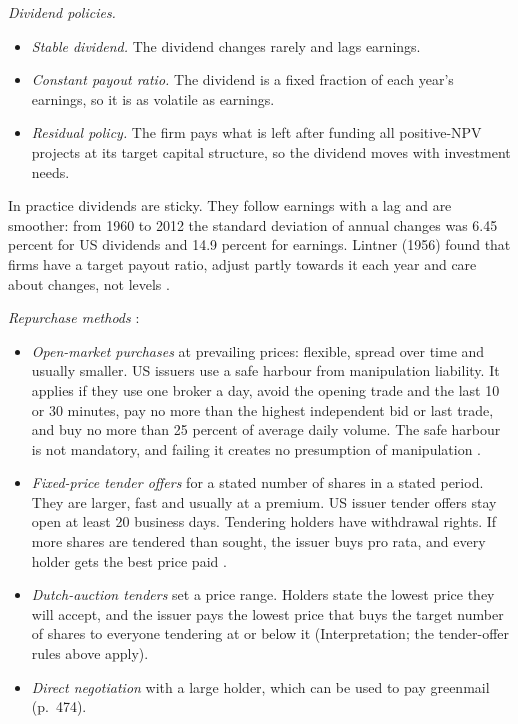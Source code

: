 \begin{qfmethod}\label{meth:payout-policy-comparison}
 \emph{Dividend policies.}
\begin{itemize}
\item \emph{Stable dividend.} The dividend changes rarely and lags earnings.
\item \emph{Constant payout ratio.} The dividend is a fixed fraction of each year's earnings, so it is as volatile as earnings.
\item \emph{Residual policy.} The firm pays what is left after funding all positive-NPV projects at its target capital structure, so the dividend moves with investment needs.
\end{itemize}
In practice dividends are sticky. They follow earnings with a lag and are smoother: from 1960 to 2012 the standard deviation of annual changes was 6.45 percent for US dividends and 14.9 percent for earnings. Lintner (1956) found that firms have a target payout ratio, adjust partly towards it each year and care about changes, not levels \citep[pp.~442--444]{applied-corporate-finance-2014}.

\emph{Repurchase methods} \citep[p.~474]{applied-corporate-finance-2014}:
\begin{itemize}
\item \emph{Open-market purchases} at prevailing prices: flexible, spread over time and usually smaller. US issuers use a safe harbour from manipulation liability. It applies if they use one broker a day, avoid the opening trade and the last 10 or 30 minutes, pay no more than the highest independent bid or last trade, and buy no more than 25 percent of average daily volume. The safe harbour is not mandatory, and failing it creates no presumption of manipulation \citep[paras.~(b)--(d)]{cfr-240-10b-18}.
\item \emph{Fixed-price tender offers} for a stated number of shares in a stated period. They are larger, fast and usually at a premium. US issuer tender offers stay open at least 20 business days. Tendering holders have withdrawal rights. If more shares are tendered than sought, the issuer buys pro rata, and every holder gets the best price paid \citep[para.~(f)]{cfr-240-13e-4}.
\item \emph{Dutch-auction tenders} set a price range. Holders state the lowest price they will accept, and the issuer pays the lowest price that buys the target number of shares to everyone tendering at or below it (Interpretation; the tender-offer rules above apply).
\item \emph{Direct negotiation} with a large holder, which can be used to pay greenmail (p.~474).
\end{itemize}


\end{qfmethod}
